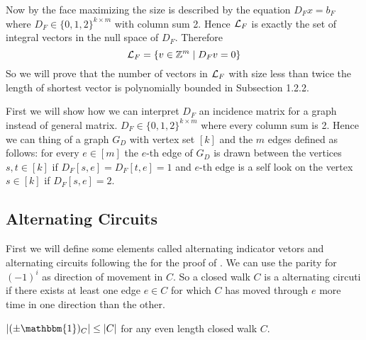 Now by  the face maximizing the size is described by the equation $D_Fx=b_F$ where $D_F\in \{0,1,2\}^{k\times m}$ with column sum 2. Hence $\mathcal{L}_F$ is exactly the set of integral vectors in the null space of $D_F$. Therefore $$\mathcal{L}_F=\{v\in\mathbb{Z}^{m}\mid D_Fv=0\}$$So we will prove that the number of vectors in $\mathcal{L}_F$ with size less than twice the length of shortest vector is polynomially bounded in Subsection 1.2.2.

First we will show how we can interpret $D_F$ an incidence matrix for a graph instead of general matrix. $D_F\in \{0,1,2\}^{k\times m}$ where every column sum is 2. Hence we can thing of a graph $G_D$ with vertex set $[k]$ and the $m$ edges defined as follows: for every $e\in [m]$ the $e$-th edge of $G_D$ is drawn between the vertices $s,t\in[k]$ if $D_F[s,e]=D_F[t,e]=1$ and $e$-th edge is a self look on the vertex $s\in[k]$ if $D_F[s,e]=2$.
\subsection{Alternating Circuits}
First we will define some elements called alternating indicator vetors and alternating circuits following the \cite{SvenssonTarnawski_2017_TMP_CONF} for the proof of .
We can use the parity for $(-1)^{i}$ as direction of movement in $C$. So a closed walk $C$ is a alternating circuti if there exists at least one edge $e\in C$ for which $C$ has moved through $e$ more time in one direction than the other.
\begin{observation*}
	$|(\pm \mathbbm{1})_C|\leq |C|$ for any even length closed walk $C$.
\end{observation*}


